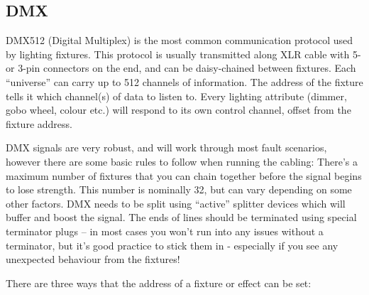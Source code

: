 \documentclass[14pt]{article} %
\let\Oldsubsection\subsection
\renewcommand{\subsection}{\FloatBarrier\Oldsubsection}
\begin{document}
\subsection{DMX}

DMX512 (Digital Multiplex) is the most common communication protocol used by lighting fixtures. This protocol is usually transmitted along XLR cable with 5- or 3-pin connectors on the end, and can be daisy-chained between fixtures. Each “universe” can carry up to 512 channels of information. The address of the fixture tells it which channel(s) of data to listen to. Every lighting attribute (dimmer, gobo wheel, colour etc.) will respond to its own control channel, offset from the fixture address. 

DMX signals are very robust, and will work through most fault scenarios, however there are some basic rules to follow when running the cabling: There’s a maximum number of fixtures that you can chain together before the signal begins to lose strength. This number is nominally 32, but can vary depending on some other factors. DMX needs to be split using “active” splitter devices which will buffer and boost the signal. The ends of lines should be terminated using special terminator plugs – in most cases you won’t run into any issues without a terminator, but it’s good practice to stick them in - especially if you see any unexpected behaviour from the fixtures!

There are three ways that the address of a fixture or effect can be set:
\end{document}
